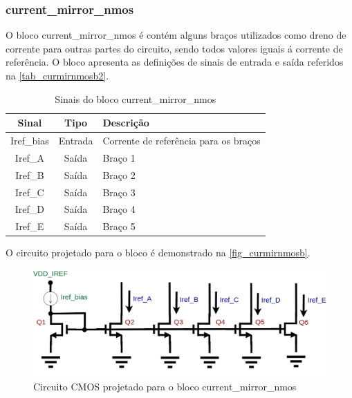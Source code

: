 \renewcommand{\NomeBloco}{current\_mirror\_nmos}
\renewcommand{\NomeBlocoNoUnderline}{curmirnmosb}
\renewcommand{\NomePTab}{tab_\NomeBlocoNoUnderline}
\renewcommand{\NomeSTab}{tab_\NomeBlocoNoUnderline2}
\renewcommand{\NomePFig}{fig_\NomeBlocoNoUnderline}
\renewcommand{\NomeSFig}{fig_\NomeBlocoNoUnderline2}
\renewcommand{\NomeTTab}{tab_\NomeBlocoNoUnderline3}
\renewcommand{\NomeQTab}{tab_\NomeBlocoNoUnderline4}

\subsubsection{\NomeBloco}

O bloco \NomeBloco{} \'e cont\'em alguns bra{\c c}os utilizados como dreno de corrente para outras partes do circuito, sendo todos valores iguais \'a corrente de refer\^encia. O bloco apresenta as defini{\c c}\~oes de sinais de entrada e sa\'ida referidos na \autoref{\NomeSTab}.

\begin{table}[htbp]
\caption{Sinais do bloco \NomeBloco}
\label{\NomeSTab}
\centering
\begin{tabular}{ccl}

    \toprule
    Sinal & Tipo    & Descri{\c c}\~ao        \\
    \midrule \midrule
    Iref\_bias   & Entrada   &  Corrente de refer\^encia para os bra{\c c}os \\
    \midrule
    Iref\_A   & Saída   &  Bra{\c c}o 1 \\
    \midrule
    Iref\_B   & Saída   &  Bra{\c c}o 2 \\
    \midrule
    Iref\_C   & Saída   &  Bra{\c c}o 3 \\
    \midrule
    Iref\_D   & Saída   &  Bra{\c c}o 4 \\
    \midrule
    Iref\_E   & Saída   &  Bra{\c c}o 5 \\
    \bottomrule
\end{tabular}
\end{table}

O circuito projetado para o bloco \'e demonstrado na \autoref{\NomePFig}.

\begin{figure}[htb]
 \label{\NomePFig}
 \centering
    \centering
    \caption{Circuito CMOS projetado para o bloco \NomeBloco} 
    \includegraphics[scale=0.3]{Circuitos/current_mirror.png}
\end{figure}

